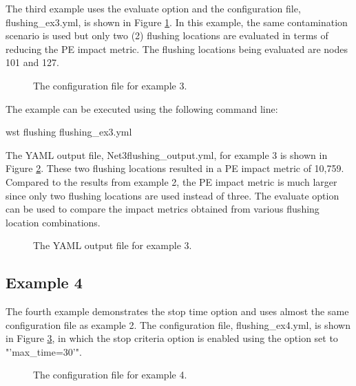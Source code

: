 The third example uses the evaluate option and the configuration 
file, flushing\_ex3.yml, is shown in Figure \ref{fig:flushing_ex3}. 
In this example, the same contamination scenario is used but only two 
(2) flushing locations are evaluated in terms of reducing the PE impact 
metric. The flushing locations being evaluated are nodes 101 and 127. 

\begin{figure}[h]
  \caption{The  configuration file for example 3.}
  \label{fig:flushing_ex3}
\end{figure}

The example can be executed using the following command line:

\begin{unknownListing}
wst flushing flushing_ex3.yml
\end{unknownListing}

The YAML output file, Net3flushing\_output.yml, for example 3 is shown 
in Figure \ref{fig:flushing_ex3_yml}. These two flushing locations 
resulted in a PE impact metric of 10,759. Compared to the results from 
example 2, the PE impact metric is much larger since only two flushing 
locations are used instead of three. The evaluate option can be used to compare 
the impact metrics obtained from various flushing location combinations. 

\begin{figure}[h]
  \caption{The  YAML output file for example 3.}
  \label{fig:flushing_ex3_yml}
\end{figure}

\subsection{Example 4}

The fourth example demonstrates the stop time option and uses almost the same configuration file as example 2. 
The configuration file, flushing\_ex4.yml, is shown in Figure \ref{fig:flushing_ex4}, in which 
the stop criteria option is enabled using the  option set to "'max\_time=30'".

\begin{figure}[h]
  \caption{The  configuration file for example 4.}
  \label{fig:flushing_ex4}
\end{figure}

